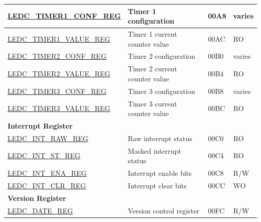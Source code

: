 \begin{longtable}{ | p{6cm} | p{7.2cm} | p{1.3cm} | p{1cm} | }
\hyperref[regdesc:LEDCTIMERXCONFREG]{LEDC\_TIMER1\_CONF\_REG} & Timer 1 configuration & \hexprefix{}00A8 & varies \\ \hline
\hyperref[regdesc:LEDCTIMERXVALUEREG]{LEDC\_TIMER1\_VALUE\_REG} & Timer 1 current counter value & \hexprefix{}00AC & RO \\ \hline
\hyperref[regdesc:LEDCTIMERXCONFREG]{LEDC\_TIMER2\_CONF\_REG} & Timer 2 configuration & \hexprefix{}00B0 & varies \\ \hline
\hyperref[regdesc:LEDCTIMERXVALUEREG]{LEDC\_TIMER2\_VALUE\_REG} & Timer 2 current counter value & \hexprefix{}00B4 & RO \\ \hline
\hyperref[regdesc:LEDCTIMERXCONFREG]{LEDC\_TIMER3\_CONF\_REG} & Timer 3 configuration & \hexprefix{}00B8 & varies \\ \hline
\hyperref[regdesc:LEDCTIMERXVALUEREG]{LEDC\_TIMER3\_VALUE\_REG} & Timer 3 current counter value & \hexprefix{}00BC & RO \\ \hline
\multicolumn{4}{|l|}{\textbf{Interrupt Register}} \\ \hline
\hyperref[regdesc:LEDCINTRAWREG]{LEDC\_INT\_RAW\_REG} & Raw interrupt status & \hexprefix{}00C0 & RO \\ \hline
\hyperref[regdesc:LEDCINTSTREG]{LEDC\_INT\_ST\_REG} & Masked interrupt status & \hexprefix{}00C4 & RO \\ \hline
\hyperref[regdesc:LEDCINTENAREG]{LEDC\_INT\_ENA\_REG} & Interrupt enable bits & \hexprefix{}00C8 & R/W \\ \hline
\hyperref[regdesc:LEDCINTCLRREG]{LEDC\_INT\_CLR\_REG} & Interrupt clear bits & \hexprefix{}00CC & WO \\ \hline
\multicolumn{4}{|l|}{\textbf{Version Register}} \\ \hline
\hyperref[regdesc:LEDCDATEREG]{LEDC\_DATE\_REG} & Version control register & \hexprefix{}00FC & R/W \\ \hline
\end{longtable}
